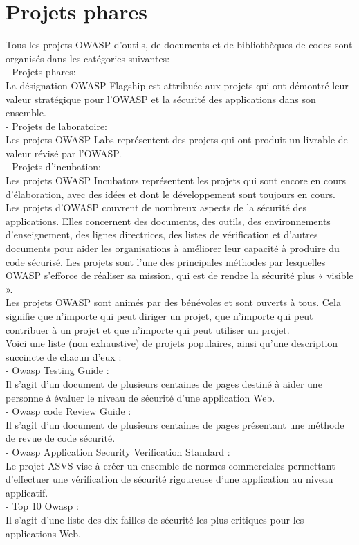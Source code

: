 \section{Projets phares}
Tous les projets OWASP d'outils, de documents et de bibliothèques de codes sont organisés dans les catégories suivantes: \\
- Projets phares: \\
La désignation OWASP Flagship est attribuée aux projets qui ont démontré leur valeur stratégique pour l’OWASP et la sécurité des applications dans son ensemble.\\
- Projets de laboratoire: \\
Les projets OWASP Labs représentent des projets qui ont produit un livrable de valeur révisé par l’OWASP.\\
- Projets d'incubation: \\
Les projets OWASP Incubators représentent les projets qui sont encore en cours d'élaboration, avec des idées et dont le développement sont toujours en cours.\\
Les projets d'OWASP couvrent de nombreux aspects de la sécurité des applications. Elles concernent des documents, des outils, des environnements d'enseignement, des lignes directrices, des listes de vérification et d'autres documents pour aider les organisations à améliorer leur capacité à produire du code sécurisé. Les projets sont l'une des principales méthodes par lesquelles OWASP s'efforce de réaliser sa mission, qui est de rendre la sécurité plus « visible ».\\
Les projets OWASP sont animés par des bénévoles et sont ouverts à tous. Cela signifie que n'importe qui peut diriger un projet, que n'importe qui peut contribuer à un projet et que n'importe qui peut utiliser un projet. \\
Voici une liste (non exhaustive) de projets populaires, ainsi qu’une description succincte de chacun d'eux :\\
- Owasp Testing Guide : \\
Il s'agit d'un document de plusieurs centaines de pages destiné à aider une personne à évaluer le niveau de sécurité d'une application Web. \\
- Owasp code Review Guide : \\
Il s'agit d'un document de plusieurs centaines de pages présentant une méthode de revue de code sécurité.\\
- Owasp Application Security Verification Standard : \\
Le projet ASVS vise à créer un ensemble de normes commerciales permettant d'effectuer une vérification de sécurité rigoureuse d’une application au niveau applicatif.\\
- Top 10 Owasp : \\
Il s'agit d'une liste des dix failles de sécurité les plus critiques pour les applications Web.\\

